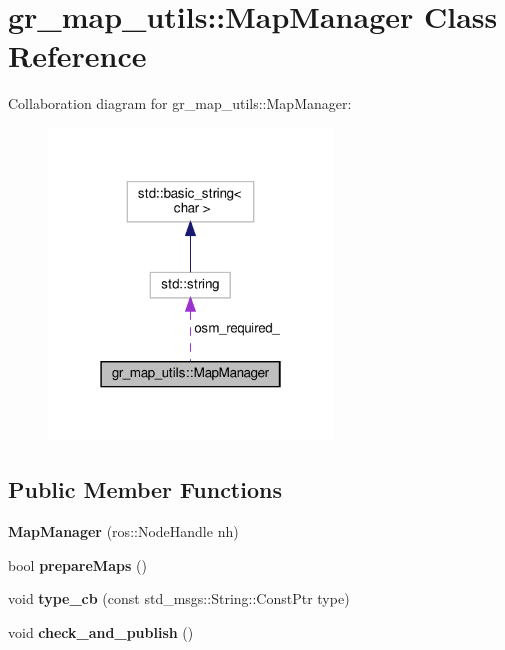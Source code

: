 \hypertarget{classgr__map__utils_1_1MapManager}{}\section{gr\+\_\+map\+\_\+utils\+:\+:Map\+Manager Class Reference}
\label{classgr__map__utils_1_1MapManager}


Collaboration diagram for gr\+\_\+map\+\_\+utils\+:\+:Map\+Manager\+:
\nopagebreak
\begin{figure}[H]
\begin{center}
\leavevmode
\includegraphics[width=214pt]{classgr__map__utils_1_1MapManager__coll__graph}
\end{center}
\end{figure}
\subsection*{Public Member Functions}
\begin{DoxyCompactItemize}
\item 
\mbox{\label{classgr__map__utils_1_1MapManager_af0995b69aceebed7e21dad0a89a8609c}} 
{\bfseries Map\+Manager} (ros\+::\+Node\+Handle nh)
\item 
\mbox{\label{classgr__map__utils_1_1MapManager_af094ec9d57f005530b71f5a5d19707ac}} 
bool {\bfseries prepare\+Maps} ()
\item 
\mbox{\label{classgr__map__utils_1_1MapManager_a3237c25a17cb93e674ea58daf327b3c2}} 
void {\bfseries type\+\_\+cb} (const std\+\_\+msgs\+::\+String\+::\+Const\+Ptr type)
\item 
\mbox{\label{classgr__map__utils_1_1MapManager_a26ef810a4fde26dc63377bc7f97ec0f4}} 
void {\bfseries check\+\_\+and\+\_\+publish} ()
\end{DoxyCompactItemize}
